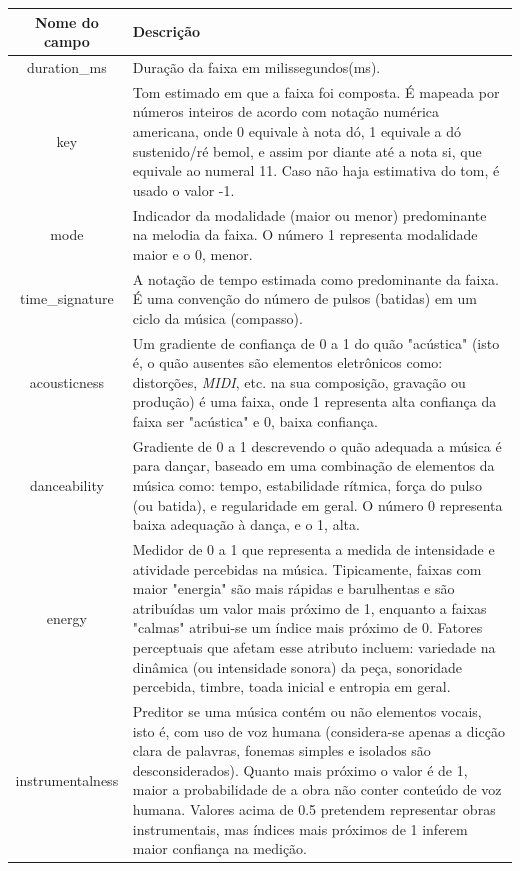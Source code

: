 \begin{tabularx}{\linewidth}{c|X}
\caption{Descrição das características da análise de áudio}\label{t.audio_features_desc}\\
\toprule
\textbf{Nome do campo} & \textbf{Descrição}\\[6pt]
\midrule
\endhead
	{duration\_ms} & {Duração da faixa em milissegundos(ms).}\\\hline
	{key} & {Tom estimado em que a faixa foi composta. É mapeada por números inteiros de acordo com notação numérica americana, onde 0 equivale à nota dó, 1 equivale a dó sustenido/ré bemol, e assim por diante até a nota si, que equivale ao numeral 11. Caso não haja estimativa do tom, é usado o valor -1.}\\\hline
	{mode} & {Indicador da modalidade (maior ou menor) predominante na melodia da faixa. O número 1 representa modalidade maior e o 0, menor.}\\\hline
	{time\_signature} & {A notação de tempo estimada como predominante da faixa. É uma convenção do número de pulsos (batidas) em um ciclo da música (compasso).}\\\hline
	{acousticness} & {Um gradiente de confiança de 0 a 1 do quão "acústica" (isto é, o quão ausentes são elementos eletrônicos como: distorções, \textit{MIDI}, etc. na sua composição, gravação ou produção) é uma faixa, onde 1 representa alta confiança da faixa ser "acústica" e 0, baixa confiança.}\\\hline
	{danceability} & {Gradiente de 0 a 1 descrevendo o quão adequada a música é para dançar, baseado em uma combinação de elementos da música como: tempo, estabilidade rítmica, força do pulso (ou batida), e regularidade em geral. O número 0 representa baixa adequação à dança, e o 1, alta.}\\\hline
	{energy} & {Medidor de 0 a 1 que representa a medida de intensidade e atividade percebidas na música. Tipicamente, faixas com maior "energia" são mais rápidas e barulhentas e são atribuídas um valor mais próximo de 1, enquanto a faixas "calmas" atribui-se um índice mais próximo de 0. Fatores perceptuais que afetam esse atributo incluem: variedade na dinâmica (ou intensidade sonora) da peça, sonoridade percebida, timbre, toada inicial e entropia em geral.}\\\hline
	{instrumentalness} & {Preditor se uma música contém ou não elementos vocais, isto é, com uso de voz humana (considera-se apenas a dicção clara de palavras, fonemas simples e isolados são desconsiderados). Quanto mais próximo o valor é de 1, maior a probabilidade de a obra não conter conteúdo de voz humana. Valores acima de 0.5 pretendem representar obras instrumentais, mas índices mais próximos de 1 inferem maior confiança na medição.}\\\hline

\end{tabularx}
